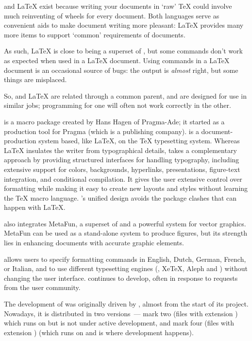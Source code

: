 \plaintex{} and \LaTeX{} exist because writing your documents in `raw'
\TeX{} could involve much reinventing of wheels for every document.
Both languages serve as convenient aids to make document writing more
pleasant: \LaTeX{} provides many more items to support `common'
requirements of documents.

As such, \LaTeX{} is close to being a superset of \plaintex{}, but
some \plaintex{} commands don't work as expected when used in a
\LaTeX{} document.  Using \plaintex{} commands in a \LaTeX{} document
is an occasional source of bugs: the output is \emph{almost} right,
but some things are misplaced.

So, \plaintex{} and \LaTeX{} are related through a common parent, and
are designed for use in similar jobs; programming for one will often
not work correctly in the other.


\href{http://www.pragma-ade.com/}{\context{}} is a macro package
created by Hans Hagen of Pragma-Ade; it started as a production tool
for Pragma (which is a publishing company).  \CONTeXT{} is a
document-production system based, like \LaTeX{}, on the \TeX{}
typesetting system.  Whereas \LaTeX{} insulates the writer from
typographical details, \context{} takes a complementary approach by
providing structured interfaces for handling typography, including
extensive support for colors, backgrounds, hyperlinks, presentations,
figure-text integration, and conditional compilation.  It gives the
user extensive control over formatting while making it easy to create
new layouts and styles without learning the \TeX{} macro
language. \CONTeXT{}'s unified design avoids the package clashes that
can happen with \LaTeX{}.

\context{} also integrates MetaFun, a superset of \MP{} and a powerful
system for vector graphics.  MetaFun can be used as a stand-alone
system to produce figures, but its strength lies in enhancing
\context{} documents with accurate graphic elements.

\context{} allows users to specify formatting commands in English,
Dutch, German, French, or Italian, and to use different typesetting
engines (\PDFTeX{}, Xe\TeX{}, Aleph and \LuaTeX{}) without
changing the user interface. \context{} continues to develop, often in
response to requests from the user community.

The development of  was originally driven
by \context{}, almost from the start of its project.  Nowadays,
\context{} it is distributed in two versions~--- mark two (files with
extension ) which runs on \pdftex{} but is not under
active development, and mark four (files with extension
) (which runs on \LuaTeX{} and is where development
happens).

